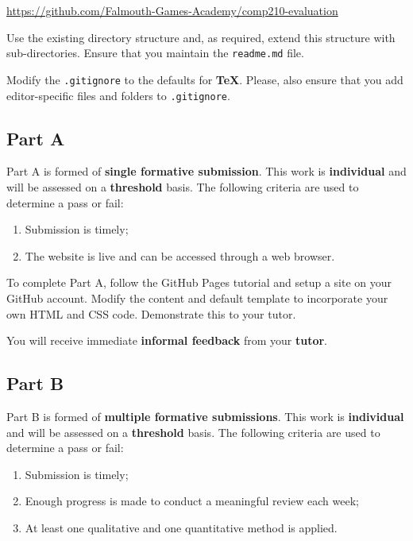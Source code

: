 \documentclass{../fal_assignment}
\begin{document}
\indent \url{https://github.com/Falmouth-Games-Academy/comp210-evaluation}

Use the existing directory structure and, as required, extend this structure with sub-directories. Ensure that you maintain the \texttt{readme.md} file.

Modify the \texttt{.gitignore} to the defaults for \textbf{TeX}. Please, also ensure that you add editor-specific files and folders to \texttt{.gitignore}. 

\subsection*{Part A}

Part A is formed of \textbf{single formative submission}. This work is \textbf{individual} and will be assessed on a \textbf{threshold} basis. The following criteria are used to determine a pass or fail:

\begin{enumerate}[label=(\alph*)]
	\item Submission is timely;
	\item The website is live and can be accessed through a web browser.
\end{enumerate}

To complete Part A, follow the GitHub Pages tutorial and setup a site on your GitHub account.  Modify the content and default template to incorporate your own HTML and CSS code. Demonstrate this to your tutor.

You will receive immediate \textbf{informal feedback} from your \textbf{tutor}.

\subsection*{Part B}

Part B is formed of \textbf{multiple formative submissions}. This work is \textbf{individual} and will be assessed on a \textbf{threshold} basis. The following criteria are used to determine a pass or fail:

\begin{enumerate}[label=(\alph*)]
	\item Submission is timely;
	\item Enough progress is made to conduct a meaningful review each week;
	\item At least one qualitative and one quantitative method is applied.
\end{enumerate}
\end{document}
